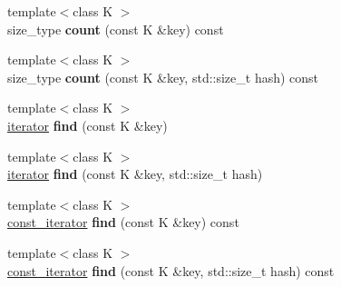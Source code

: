 \begin{DoxyCompactItemize}
{\footnotesize template$<$class K $>$ }\\size\+\_\+type {\bfseries count} (const K \&key) const
\item 
\mbox{\label{classtsl_1_1detail__robin__hash_1_1robin__hash_a8c6333cece791f9f1fb847a94f959d67}} 
{\footnotesize template$<$class K $>$ }\\size\+\_\+type {\bfseries count} (const K \&key, std\+::size\+\_\+t hash) const
\item 
\mbox{\label{classtsl_1_1detail__robin__hash_1_1robin__hash_a0b90c6fc2c844cdb217d36e20d3b8348}} 
{\footnotesize template$<$class K $>$ }\\\mbox{\hyperlink{classtsl_1_1detail__robin__hash_1_1robin__hash_1_1robin__iterator}{iterator}} {\bfseries find} (const K \&key)
\item 
\mbox{\label{classtsl_1_1detail__robin__hash_1_1robin__hash_aba739652aec161a8d13c675e2c3bdabe}} 
{\footnotesize template$<$class K $>$ }\\\mbox{\hyperlink{classtsl_1_1detail__robin__hash_1_1robin__hash_1_1robin__iterator}{iterator}} {\bfseries find} (const K \&key, std\+::size\+\_\+t hash)
\item 
\mbox{\label{classtsl_1_1detail__robin__hash_1_1robin__hash_a0e8902ef4b9ed0bb7bf8deb1ef54b638}} 
{\footnotesize template$<$class K $>$ }\\\mbox{\hyperlink{classtsl_1_1detail__robin__hash_1_1robin__hash_1_1robin__iterator}{const\+\_\+iterator}} {\bfseries find} (const K \&key) const
\item 
\mbox{\label{classtsl_1_1detail__robin__hash_1_1robin__hash_a7f06f5524823bbb95c88a281f0047919}} 
{\footnotesize template$<$class K $>$ }\\\mbox{\hyperlink{classtsl_1_1detail__robin__hash_1_1robin__hash_1_1robin__iterator}{const\+\_\+iterator}} {\bfseries find} (const K \&key, std\+::size\+\_\+t hash) const
\item 
\mbox{\label{classtsl_1_1detail__robin__hash_1_1robin__hash_a59beac1bdf937af5803da9c60a3f9e37}} 

\end{DoxyCompactItemize}
